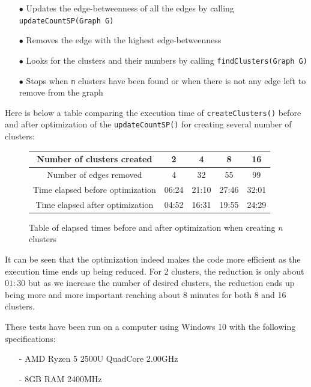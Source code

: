 \documentclass{article}
\begin{document}
\begin{itemize}
\item[$\bullet$] Updates the edge-betweenness of all the edges by calling \texttt{updateCountSP(Graph G)}
\item[$\bullet$] Removes the edge with the highest edge-betweenness
\item[$\bullet$] Looks for the clusters and their numbers by calling \texttt{findClusters(Graph G)}
\item[$\bullet$] Stops when \texttt{n} clusters have been found or when there is not any edge left to remove from the graph
\end{itemize}

\medbreak

Here is below a table comparing the execution time of \texttt{createClusters()} before and after optimization of the \texttt{updateCountSP()} for creating several number of clusters:

\begin{center}
\begin{figure}[h]
\begin{center}
\begin{tabular}{ |c|c|c|c|c| } 
 \hline
 Number of clusters created & 2 & 4 & 8 & 16 \\ 
 \hline
 Number of edges removed & 4 & 32 & 55 & 99 \\
 \hline
 Time elapsed before optimization & 06:24 & 21:10 & 27:46 & 32:01 \\
 \hline
 Time elapsed after optimization & 04:52 & 16:31 & 19:55 & 24:29 \\
 \hline
\end{tabular}
\end{center}
\caption{Table of elapsed times before and after optimization when creating $n$ clusters}
\end{figure}
\end{center}

It can be seen that the optimization indeed makes the code more efficient as the execution time ends up being reduced. For 2 clusters, the reduction is only about $01:30$ but as we increase the number of desired clusters, the reduction ends up being more and more important reaching about 8 minutes for both 8 and 16 clusters.

These tests have been run on a computer using Windows 10 with the following specifications:
\begin{itemize}
\item[-] AMD Ryzen 5 2500U QuadCore 2.00GHz
\item[-] 8GB RAM 2400MHz
\end{itemize}
\end{document}

